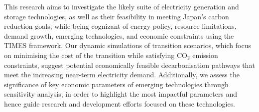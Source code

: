 This research aims to investigate the likely suite of electricity generation and storage technologies, as well as their feasibility in meeting Japan's carbon reduction goals, while being cognizant of energy policy, resource limitations, demand growth, emerging technologies, and economic constraints using the \gls{TIMES} framework. Our dynamic simulations of transition scenarios, which focus on minimising the cost of the transition while satisfying CO$_2$ emission constraints, suggest potential economically feasible decarbonisation pathways that meet the increasing near-term electricity demand. Additionally, we assess the significance of key economic parameters of emerging technologies through sensitivity analysis, in order to highlight the most impactful parameters and hence guide research and development efforts focused on these technologies.
